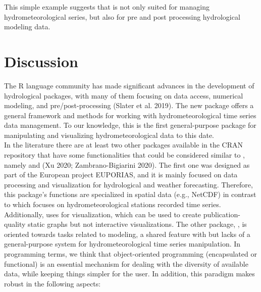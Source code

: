 \noindent
This simple example suggests that  is not only
suited for managing hydrometeorological series, but also for pre
and post processing hydrological modeling data.

\hypertarget{discussion}{%
\section{Discussion}\label{discussion}}

The R language community has made significant advances in the development
of hydrological packages, with many of them focusing on data access,
numerical modeling, and pre/post-processing (Slater et al. 2019). The new
 package offers a general framework and methods for working with
hydrometeorological time series data management. To our knowledge, this
is the first general-purpose package for manipulating and visualizing
hydrometeorological data to this date.\\
In the literature there are at least two other packages available in the
CRAN repository that have some functionalities that could be considered
similar to , namely  and 
(Xu 2020; Zambrano-Bigiarini 2020). The first one was designed
as part of the European project EUPORIAS, and it is mainly focused
on data processing and visualization for hydrological and weather forecasting.
Therefore, this package's functions are specialized in spatial data
(e.g., NetCDF) in contrast to  which focuses on
hydrometeorological stations recorded time series.
Additionally,  uses  for visualization, which
can be used to create publication-quality static graphs but not interactive
visualizations. The other package, , is oriented towards tasks
related to modeling, a shared feature with  but lacks
of a general-purpose system for hydrometeorological time series manipulation.
In programming terms, we think that object-oriented programming
(encapsulated or functional) is an essential mechanism for dealing with the
diversity of available data, while keeping things simpler for the user.
In addition, this paradigm makes  robust in the following
aspects:

